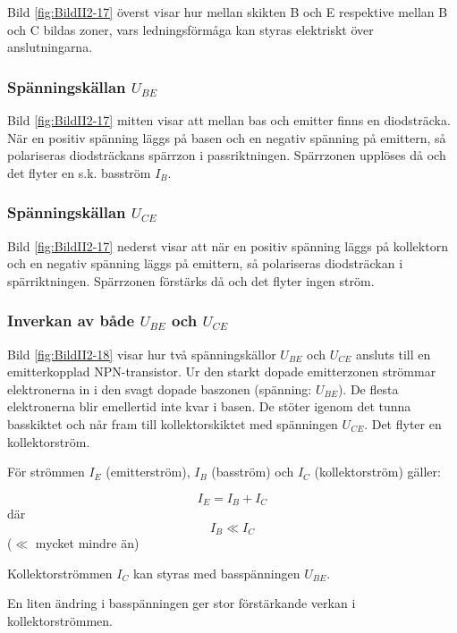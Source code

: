 Bild \ref{fig:BildII2-17} överst visar hur mellan skikten B och E respektive
mellan B och C bildas zoner, vars ledningsförmåga kan styras elektriskt över
anslutningarna.

\subsubsection{Spänningskällan \(U_{BE}\)}

Bild \ref{fig:BildII2-17} mitten visar att mellan bas och emitter finns en
diodsträcka.
När en positiv spänning läggs på basen och en negativ spänning på emittern,
så polariseras diodsträckans spärrzon i passriktningen.
Spärrzonen upplöses då och det flyter en s.k. basström \(I_B\).

\subsubsection{Spänningskällan \(U_{CE}\)}

Bild \ref{fig:BildII2-17} nederst visar att när en positiv spänning läggs
på kollektorn och en negativ spänning läggs på emittern, så polariseras
diodsträckan i spärriktningen.
Spärrzonen förstärks då och det flyter ingen ström.

\subsubsection{Inverkan av både \(U_{BE}\) och \(U_{CE}\)}

Bild \ref{fig:BildII2-18} visar hur två spänningskällor \(U_{BE}\) och
\(U_{CE}\) ansluts till en emitterkopplad NPN-transistor.
Ur den starkt dopade emitterzonen strömmar elektronerna in i den svagt dopade
baszonen (spänning: \(U_{BE}\)).
De flesta elektronerna blir emellertid inte kvar i basen.
De stöter igenom det tunna basskiktet och når fram till
kollektorskiktet med spänningen \(U_{CE}\). Det flyter en kollektorström.

För strömmen \(I_E\) (emitterström), \(I_B\) (basström) och \(I_C\)
(kollektorström) gäller:

\[I_E = I_B + I_C\] där \[I_B \ll I_C\] (\(\ll\) mycket mindre än)

Kollektorströmmen \(I_C\) kan styras med basspänningen \(U_{BE}\).

En liten ändring i basspänningen ger stor förstärkande verkan i
kollektorströmmen.

